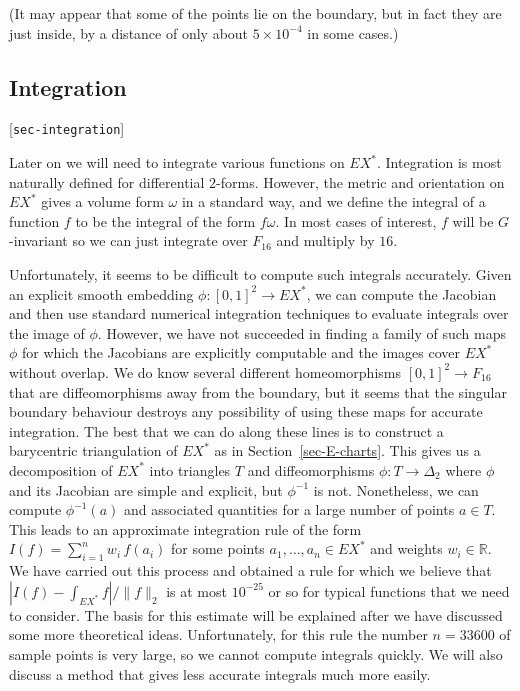 \documentclass[reqno]{amsart}
\newcommand{\lbl}[1]{\label{#1}\textup{[\texttt{#1}]}\par}
\newcommand{\lbl}{\label}
\newcommand{\Dl}        {\Delta}
\newcommand{\om}        {\omega}
\newcommand{\R}         {{\mathbb{R}}}
\newcommand{\tm}        {\times}
\renewcommand{\:}{\colon}
\theoremstyle{definition}
\begin{document}
(It may appear that some of the points lie on the boundary, but in
fact they are just inside, by a distance of only about $5\tm 10^{-4}$ in
some cases.)

\subsection{Integration}
\lbl{sec-integration}

Later on we will need to integrate various functions on $EX^*$.
Integration is most naturally defined for differential $2$-forms.
However, the metric and orientation on $EX^*$ gives a volume form $\om$
in a standard way, and we define the integral of a function $f$ to be
the integral of the form $f\om$.  In most cases of interest, $f$ will
be $G$-invariant so we can just integrate over $F_{16}$ and multiply
by $16$.

Unfortunately, it seems to be difficult to compute such integrals
accurately.  Given an explicit smooth embedding
$\phi\:[0,1]^2\to EX^*$, we can compute the Jacobian and then use
standard numerical integration techniques to evaluate integrals over
the image of $\phi$.  However, we have not succeeded in finding a
family of such maps $\phi$ for which the Jacobians are explicitly
computable and the images cover $EX^*$ without overlap.  We do know
several different homeomorphisms $[0,1]^2\to F_{16}$ that are
diffeomorphisms away from the boundary, but it seems that the singular
boundary behaviour destroys any possibility of using these maps for
accurate integration.  The best that we can do along these lines is to
construct a barycentric triangulation of $EX^*$ as in
Section~\ref{sec-E-charts}.  This gives us a decomposition of $EX^*$
into triangles $T$ and diffeomorphisms $\phi\:T\to\Dl_2$ where $\phi$
and its Jacobian are simple and explicit, but $\phi^{-1}$ is not.
Nonetheless, we can compute $\phi^{-1}(a)$ and associated quantities
for a large number of points $a\in T$.  This leads to an approximate
integration rule of the form $I(f)=\sum_{i=1}^nw_i\,f(a_i)$ for some
points $a_1,\dotsc,a_n\in EX^*$ and weights $w_i\in\R$.  We have
carried out this process and obtained a rule for which we believe that
$|I(f)-\int_{EX^*}f|/\|f\|_2$ is at most $10^{-25}$ or so for typical
functions that we need to consider.  The basis for this estimate will
be explained after we have discussed some more theoretical ideas.
Unfortunately, for this rule the number $n=33600$ of sample points is
very large, so we cannot compute integrals quickly.  We will also
discuss a method that gives less accurate integrals much more easily.
\end{document}

